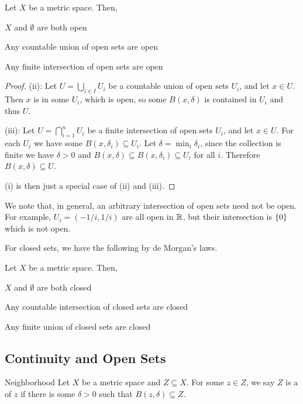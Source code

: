 \documentclass{styles/tufte}
\begin{document}
\begin{proposition}{}{}
  Let $X$ be a metric space. Then,
  \begin{romanenum}
    \item $X$ and $\emptyset$ are both open
    \item Any countable union of open sets are open
    \item Any finite intersection of open sets are open
  \end{romanenum}
\end{proposition}
\begin{proof}
  (ii): Let $U = \bigcup_{i \in I} U_i$ be a countable union of open sets $U_i$, and let $x \in U$. Then $x$ is in some $U_i$, which is open, so some $B(x, \delta)$ is contained in $U_i$ and thus $U$.
  
  (iii): Let $U = \bigcap_{i=1}^n U_i$ be a finite intersection of open sets $U_i$, and let $x \in U$. For each $U_i$ we have some $B(x, \delta_i) \subseteq U_i$. Let $\delta = \min_i \delta_i$, since the collection is finite we have $\delta > 0$ and $B(x, \delta) \subseteq B(x, \delta_i) \subseteq U_i$ for all $i$. Therefore $B(x, \delta) \subseteq U$.
  
  (i) is then just a special case of (ii) and (iii).
\end{proof}

We note that, in general, an arbitrary intersection of open sets need not be open. For example, $U_i = (-1/i, 1/i)$ are all open in $\mathbb{R}$, but their intersection is $\set{0}$ which is not open.

For closed sets, we have the following by de Morgan's laws.

\begin{proposition}{}{}
  Let $X$ be a metric space. Then,
  \begin{romanenum}
    \item $X$ and $\emptyset$ are both closed
    \item Any countable intersection of closed sets are closed
    \item Any finite union of closed sets are closed
  \end{romanenum}
\end{proposition}


\subsection{Continuity and Open Sets}
  
  \begin{definition}{Neighborhood}{}
    Let $X$ be a metric space and $Z \subseteq X$. For some $z \in Z$, we say $Z$ is a  of $z$ if there is some $\delta > 0$ such that $B(z, \delta) \subseteq Z$.
  \end{definition}
  
\end{document}
